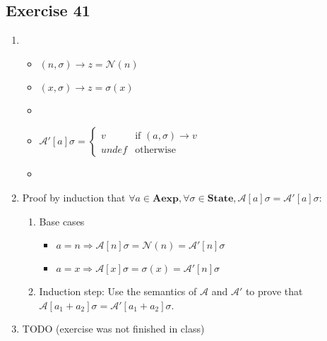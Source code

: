\documentclass[12pt,fleqn]{article}		%
\begin{document}
\subsection{Exercise 41}
\begin{enumerate}
\item
\begin{itemize}
\item $ (n, \sigma) \rightarrow z = \mathcal{N}(n) $
\item $ (x, \sigma) \rightarrow z = \sigma(x) $
\item 
\begin{prooftree}
\end{prooftree}
\item
$ \mathcal{A}'[a]\sigma = \begin{cases} v & \text{if } (a, \sigma) \rightarrow v\\ undef & \text{otherwise} \end{cases} $
\item 
\begin{prooftree}
\end{prooftree}
\end{itemize}
\item Proof by induction that $ \forall a \in \textbf{Aexp}, \forall \sigma \in \textbf{State}, \mathcal{A}[a]\sigma = \mathcal{A}'[a]\sigma $:
\begin{enumerate}
\item Base cases
\begin{itemize}
\item $ a = n \Rightarrow \mathcal{A}[n]\sigma = \mathcal{N}(n) = \mathcal{A}'[n]\sigma $
\item $ a = x \Rightarrow \mathcal{A}[x]\sigma = \sigma(x) = \mathcal{A}'[n]\sigma $
\end{itemize}
\item Induction step: Use the semantics of $ \mathcal{A} $ and $ \mathcal{A}' $ to prove that $ \mathcal{A}[a_1 + a_2]\sigma = \mathcal{A}'[a_1 + a_2]\sigma $.
\end{enumerate}
\item TODO (exercise was not finished in class)
\end{enumerate}
\end{document}
